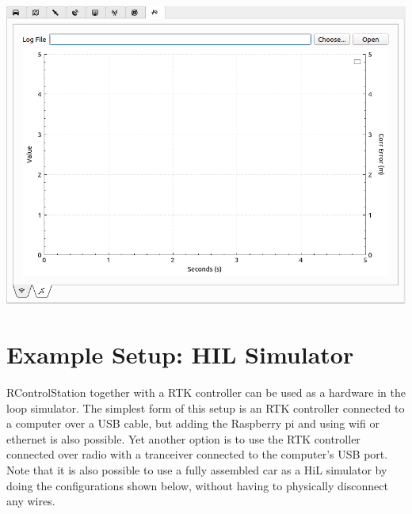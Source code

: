 \documentclass[12pt]{article} %
\def\printtodos{0}
\newcommand{\todo}[1]{
  \if\printtodos1
      {\color{red} \textbf{TODO:} #1}
  \fi}
\begin{document}
\begin{minipage}{0.3\linewidth}
\noindent \includegraphics[width=\textwidth]{./screens/Log3.png}
\end{minipage}





\section{Example Setup: HIL Simulator}

RControlStation together with a RTK controller can be used as a
hardware in the loop simulator. The simplest form of this setup is an
RTK controller connected to a computer over a USB cable, but adding
the Raspberry pi and using wifi or ethernet is also possible. Yet
another option is to use the RTK controller connected over radio with
a tranceiver connected to the computer's USB port. Note that it is
also possible to use a fully assembled car as a HiL simulator by doing
the configurations shown below, without having to physically
disconnect any wires.  
\end{document}
